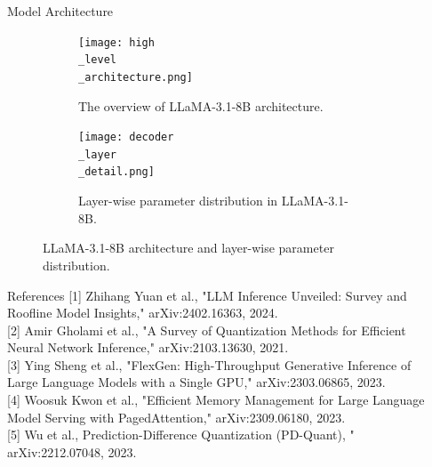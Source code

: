 \documentclass[final]{beamer}
\newlength{\sepwidth}
\newlength{\colwidth}
\newcommand{\separatorcolumn}{\begin{column}{\sepwidth}\end{column}}
\begin{document}
\begin{frame}[t]
\begin{columns}[t]
\begin{column}{\colwidth}
\begin{block}{Model Architecture}
\begin{itemize}
      \end{itemize}
      \begin{figure}
        \begin{subfigure}{0.48\colwidth}
          \centering
          \texttt{[image: high\\\_level\\\_architecture.png]}
          \caption{The overview of LLaMA-3.1-8B architecture.}
          \label{fig:llama_sturcture}
        \end{subfigure}
        \hfill
        \begin{subfigure}{0.48\colwidth}
          \centering
          \texttt{[image: decoder\\\_layer\\\_detail.png]}
          \caption{Layer-wise parameter distribution in LLaMA-3.1-8B.}
          \label{fig:decode_layer}
        \end{subfigure}
        \caption{LLaMA-3.1-8B architecture and layer-wise parameter distribution.}
      \end{figure}
  \end{block}
  \begin{block}{References}
    \vspace{0.5em}
     [1] Zhihang Yuan et al., "LLM Inference Unveiled: Survey and Roofline Model Insights," arXiv:2402.16363, 2024.\\ {}
     [2] Amir Gholami et al., "A Survey of Quantization Methods for Efficient Neural Network Inference," arXiv:2103.13630, 2021.\\ {}
     [3] Ying Sheng et al., "FlexGen: High-Throughput Generative Inference of Large Language Models with a Single GPU," arXiv:2303.06865, 2023.\\ {}
     [4] Woosuk Kwon et al., "Efficient Memory Management for Large Language Model Serving with PagedAttention," arXiv:2309.06180, 2023.\\ {}
     [5] Wu et al., Prediction-Difference Quantization (PD-Quant), " arXiv:2212.07048, 2023. \\ {}
     \vspace{0.5em}
  \end{block}
 \end{column}

 \separatorcolumn


\end{columns}
\end{frame}
\end{document}
